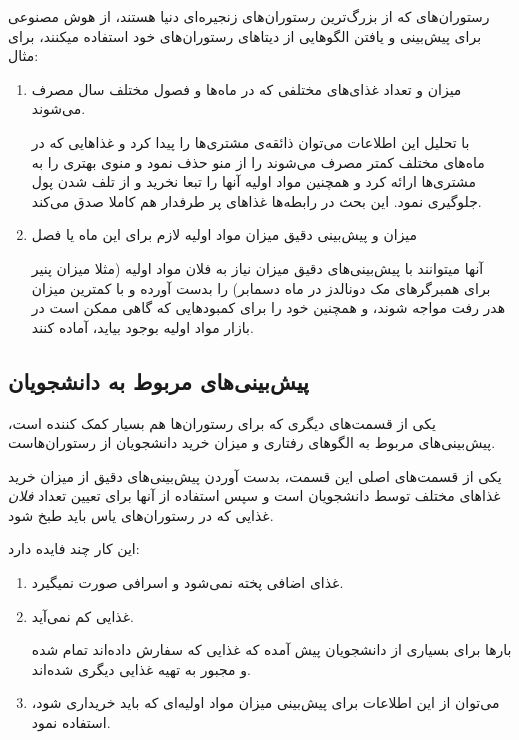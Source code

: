 \documentclass{article}
\begin{document}
	    	رستوران‌های  که از بزرگ‌ترین رستوران‌های زنجیره‌ای دنیا هستند، از هوش مصنوعی برای پیش‌بینی و یافتن الگوهایی از دیتا‌های رستوران‌های خود استفاده میکنند، برای مثال:
	    	\begin{enumerate}
	    		\item 
	    		میزان و تعداد غذای‌های مختلفی که در ماه‌‌ها و فصول مختلف سال مصرف می‌شوند. 
	    		
	    		
	    		با تحلیل این اطلاعات می‌توان ذائقه‌ی مشتری‌ها را پیدا کرد و غذاهایی که در ماه‌‌های مختلف کمتر مصرف می‌شوند را از منو حذف نمود و منوی بهتری را به مشتری‌‌ها ارائه کرد و همچنین مواد اولیه آنها را تبعا نخرید و از تلف شدن پول جلوگیری نمود. این بحث در رابطه‌ها غذاهای پر طرفدار هم کاملا صدق می‌کند.
	    		
	    		\item 
	    		میزان و پیش‌‌بینی دقیق میزان مواد اولیه لازم برای این ماه یا فصل
	    		
	    		
	    		آنها میتوانند با پیش‌بینی‌های دقیق میزان نیاز به فلان مواد اولیه (مثلا میزان پنیر برای همبرگر‌های مک دونالدز در ماه دسمابر) را بدست آورده و با کمترین میزان هدر رفت مواجه شوند، و همچنین خود را برای کمبود‌هایی که گاهی ممکن است در بازار مواد اولیه بوجود بیاید، آماده کنند.
	    	\end{enumerate}
	    \subsection{پیش‌بینی‌های مربوط به دانشجویان}
	    	یکی از قسمت‌های دیگری که برای رستوران‌ها هم بسیار کمک کننده است، پیش‌بینی‌های مربوط به الگو‌های رفتاری و میزان خرید دانشجویان از رستوران‌هاست.
	    	
	    	یکی از قسمت‌های اصلی این قسمت، بدست آوردن پیش‌بینی‌های دقیق از میزان خرید غذا‌های مختلف توسط دانشجویان است و سپس استفاده از آنها برای تعیین تعداد \textit{فلان} غذایی که در رستوران‌های یاس باید طبخ شود.
	    	
	    	این کار چند فایده‌ دارد:
	    	\begin{enumerate}
	    		\item 
	    		غذای اضافی پخته نمی‌شود و اسرافی صورت نمیگیرد.
	    		\item 
	    		غذایی کم نمی‌آید.
	    		
	    		بارها برای بسیاری از دانشجویان پیش آمده که غذایی که سفارش داده‌اند تمام شده و مجبور به تهیه غذایی دیگری شده‌اند.
	    		\item 
	    		می‌توان از این اطلاعات برای پیش‌بینی میزان مواد اولیه‌ای که باید خریداری شود، استفاده نمود.
	    	\end{enumerate}
\end{document}
